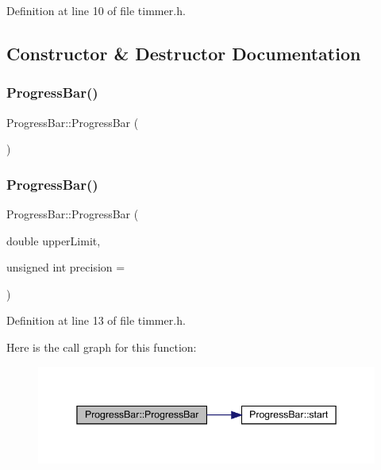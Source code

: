 Definition at line 10 of file timmer.\+h.



\subsection{Constructor \& Destructor Documentation}
\mbox{\label{class_progress_bar_a38a019ce3e526ef355433232c389b171}} 
\subsubsection{\texorpdfstring{Progress\+Bar()}{ProgressBar()}\hspace{0.1cm}{\footnotesize\ttfamily [1/2]}}
{\footnotesize\ttfamily Progress\+Bar\+::\+Progress\+Bar (\begin{DoxyParamCaption}{ }\end{DoxyParamCaption})\hspace{0.3cm}{\ttfamily [delete]}}

\mbox{\label{class_progress_bar_a5270a8af4a346e459736ea540b01ac85}} 
\subsubsection{\texorpdfstring{Progress\+Bar()}{ProgressBar()}\hspace{0.1cm}{\footnotesize\ttfamily [2/2]}}
{\footnotesize\ttfamily Progress\+Bar\+::\+Progress\+Bar (\begin{DoxyParamCaption}\item[{double}]{upper\+Limit,  }\item[{unsigned int}]{precision = {} }\end{DoxyParamCaption})\hspace{0.3cm}{\ttfamily [inline]}}



Definition at line 13 of file timmer.\+h.

Here is the call graph for this function\+:\nopagebreak
\begin{figure}[H]
\begin{center}
\leavevmode
\includegraphics[width=345pt]{class_progress_bar_a5270a8af4a346e459736ea540b01ac85_cgraph}
\end{center}
\end{figure}


